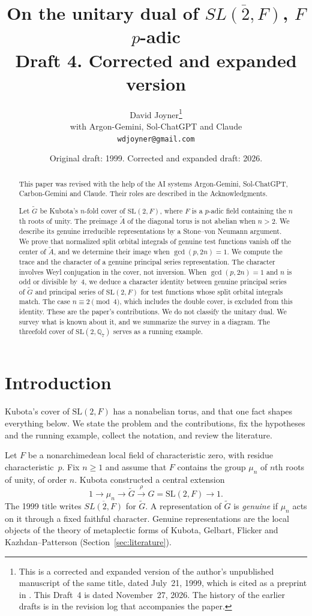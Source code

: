 \documentclass[12pt,letterpaper]{article}
\title{On the unitary dual of $\overline{SL(2,F)}$, $F$ $p$-adic\\[6pt]
\large Draft 4. Corrected and expanded version}
\author{David Joyner\thanks{This is a corrected and expanded version of
the author's unpublished manuscript of the same title, dated July~21,
1999, which is cited as a preprint in \cite{Jo01}. This Draft~4 is
dated November~27, 2026. The history of the earlier drafts is in the
revision log that accompanies the paper.}\\[2pt]
\small with Argon-Gemini, Sol-ChatGPT and Claude\\[2pt]
\small\texttt{wdjoyner@gmail.com}}
\date{Original draft: 1999. Corrected and expanded draft: 2026.}
\numberwithin{equation}{section}
\theoremstyle{plain}
\theoremstyle{definition}
\theoremstyle{remark}
\newcommand{\Gt}{\widetilde G}
\newcommand{\At}{\widetilde A}
\newcommand{\Qq}{\mathbb Q}
\newcommand{\SL}{\mathrm{SL}}
\begin{document}
\maketitle

\begin{abstract}
This paper was revised with the help of the AI systems Argon-Gemini,
Sol-ChatGPT, Carbon-Gemini and Claude. Their roles are described in the
Acknowledgments.

Let $\Gt$ be Kubota's $n$-fold cover of $\SL(2,F)$, where $F$ is a
$p$-adic field containing the $n$th roots of unity. The preimage $\At$
of the diagonal torus is not abelian when $n>2$. We describe its
genuine irreducible representations by a Stone--von Neumann argument.
We prove that normalized split orbital integrals of genuine test
functions vanish off the center of $\At$, and we determine their image
when $\gcd(p,2n)=1$. We compute the trace and the character of a
genuine principal series representation. The character involves Weyl
conjugation in the cover, not inversion. When $\gcd(p,2n)=1$ and $n$ is
odd or divisible by~$4$, we deduce a character identity between genuine
principal series of $\Gt$ and principal series of $\SL(2,F)$ for test
functions whose split orbital integrals match. The case
$n\equiv2\pmod 4$, which includes the double cover, is excluded from
this identity. These are the paper's contributions. We do not
classify the unitary dual. We survey what is known about it, and we
summarize the survey in a diagram. The threefold cover of
$\SL(2,\Qq_7)$ serves as a running example.
\end{abstract}

\tableofcontents

\section{Introduction}\label{sec:intro}

Kubota's cover of $\SL(2,F)$ has a nonabelian torus, and that one fact
shapes everything below. We state the problem and the contributions,
fix the hypotheses and the running example, collect the notation, and
review the literature.

Let $F$ be a nonarchimedean local field of characteristic zero, with
residue characteristic~$p$. Fix $n\ge1$ and assume that $F$ contains
the group $\mu_n$ of $n$th roots of unity, of order $n$. Kubota
\cite{Ku67} constructed a central extension
\[
1\longrightarrow\mu_n\longrightarrow\Gt
\stackrel{\rho}{\longrightarrow}G=\SL(2,F)\longrightarrow1 .
\]
The 1999 title writes $\overline{SL(2,F)}$ for $\Gt$. A representation
of $\Gt$ is \emph{genuine} if $\mu_n$ acts on it through a fixed
faithful character. Genuine representations are the local objects of
the theory of metaplectic forms of Kubota, Gelbart, Flicker and
Kazhdan--Patterson (Section~\ref{sec:literature}).
\end{document}
